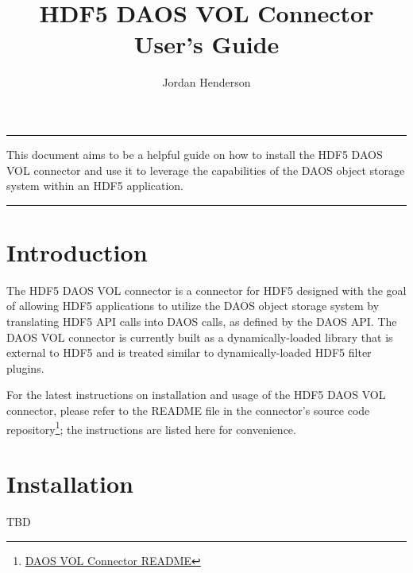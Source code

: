 \documentclass[12pt]{article}
\title{\textbf{HDF5 DAOS VOL Connector User's Guide}}
\author{Jordan Henderson}
\date{}
\begin{document}
\maketitle

\thispagestyle{fancy}

{\color{blue}\hrule}

\begin{center}

\begin{minipage}{.95\linewidth}

This document aims to be a helpful guide on how to install the HDF5 DAOS VOL connector and use it to leverage the capabilities of the DAOS object storage system within an HDF5 application.

\end{minipage}

\end{center}

\vspace{0.2in}
{\color{blue}\hrule}

\newpage

\tableofcontents
\newpage

\section{Introduction}

The HDF5 DAOS VOL connector is a connector for HDF5 designed with the goal of allowing HDF5 applications to utilize the DAOS object storage system by translating HDF5 API calls into DAOS calls, as defined by the DAOS API. The DAOS VOL connector is currently built as a dynamically-loaded library that is external to HDF5 and is treated similar to dynamically-loaded HDF5 filter plugins.

For the latest instructions on installation and usage of the HDF5 DAOS VOL connector, please refer to the README file in the connector’s source code repository\footnote{\href{https://bitbucket.hdfgroup.org/projects/HDF5VOL/repos/daos-vol/browse/README.md}{DAOS VOL Connector README}}; the instructions are listed here for convenience.

\newpage

\section{Installation}

TBD

\newpage
\end{document}
